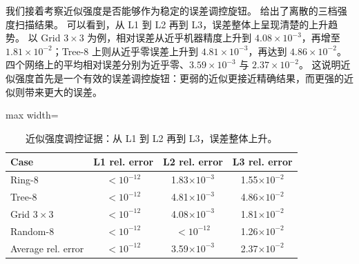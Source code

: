 我们接着考察近似强度是否能够作为稳定的误差调控旋钮。
 给出了离散的三档强度扫描结果。
可以看到，从 \textsf{L1} 到 \textsf{L2} 再到 \textsf{L3}，误差整体上呈现清楚的上升趋势。
以 Grid $3\times 3$ 为例，相对误差从近乎机器精度上升到 $4.08\times 10^{-3}$，再增至 $1.81\times 10^{-2}$；Tree-8 上则从近乎零误差上升到 $4.81\times 10^{-3}$，再达到 $4.86\times 10^{-2}$。
四个网络上的平均相对误差分别为近乎零、$3.59\times 10^{-3}$ 与 $2.37\times 10^{-2}$。
这说明近似强度首先是一个有效的误差调控旋钮：更弱的近似更接近精确结果，而更强的近似则带来更大的误差。

\begin{table}[t]
\centering
\small
\caption{近似强度调控证据：从 \textsf{L1} 到 \textsf{L2} 再到 \textsf{L3}，误差整体上升。}
\label{tab:strength-sensitivity-core}
\begin{adjustbox}{max width=\columnwidth}
\begin{tabular}{lccc}
\toprule
Case & L1 rel. error & L2 rel. error & L3 rel. error \\
\midrule
Ring-8 & $<10^{-12}$ & 1.83$\times 10^{-3}$ & 1.55$\times 10^{-2}$ \\
Tree-8 & $<10^{-12}$ & 4.81$\times 10^{-3}$ & 4.86$\times 10^{-2}$ \\
Grid $3\times 3$ & $<10^{-12}$ & 4.08$\times 10^{-3}$ & 1.81$\times 10^{-2}$ \\
Random-8 & $<10^{-12}$ & $<10^{-12}$ & 1.26$\times 10^{-2}$ \\
\midrule
Average rel. error & $<10^{-12}$ & 3.59$\times 10^{-3}$ & 2.37$\times 10^{-2}$ \\
\bottomrule
\end{tabular}
\end{adjustbox}
\end{table}


